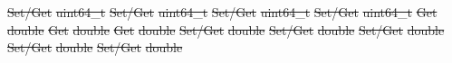 \documentclass[12pt]{report} %
\providecommand{\DIFdeltex}[1]{{\protect\color{red}\sout{#1}}}                      %
\providecommand{\DIFdel}[1]{\texorpdfstring{\DIFdeltex{#1}}{}} %
\begin{document}


\DIFdel{Set/Get }%
\DIFdel{uint64_t }%
\DIFdel{Set/Get }%
\DIFdel{uint64_t }%
\DIFdel{Set/Get }%
\DIFdel{uint64_t }%
\DIFdel{Set/Get }%
\DIFdel{uint64_t }%
\DIFdel{Get }%
\DIFdel{double }%
\DIFdel{Get }%
\DIFdel{double }%
\DIFdel{Get }%
\DIFdel{double }%
\DIFdel{Set/Get }%
\DIFdel{double }%
\DIFdel{Set/Get }%
\DIFdel{double }%
\DIFdel{Set/Get }%
\DIFdel{double }%
\DIFdel{Set/Get }%
\DIFdel{double }%
\DIFdel{Set/Get }%
\DIFdel{double }%
\end{document}
